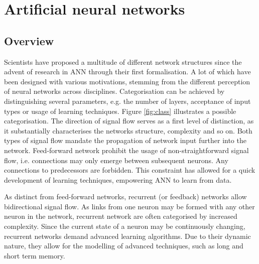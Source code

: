 \documentclass[10pt,a4paper,DIV=11]{scrreprt}
\begin{document}
\chapter{Artificial neural networks}
\label{ch:ann}
\section{Overview}

Scientists have proposed a multitude of different network structures since the advent of research in ANN through their first formalisation. 
A lot of which have been designed with various motivations, stemming from the different perception of neural networks across disciplines.
Categorisation can be achieved by distinguishing several parameters, e.g. the number of layers, acceptance of input types or usage of learning techniques.
Figure \ref{fig:class} illustrates a possible categorisation\cite{NNGER}.
The direction of signal flow serves as a first level of distinction, as it substantially characterises the networks structure, complexity and so on.
Both types of signal flow mandate the propagation of network input further into the network.
Feed-forward network prohibit the usage of non-straightforward signal flow, i.e. connections may only emerge between subsequent neurons.
Any connections to predecessors are forbidden. This constraint has allowed for a quick development of learning techniques, empowering ANN to learn from data. 

As distinct from feed-forward networks, recurrent (or feedback) networks allow bidirectional signal flow. 
As links from one neuron may be formed with any other neuron in the network, recurrent network are often categorised by increased complexity.
Since the current state of a neuron may be continuously changing, recurrent networks demand advanced learning algorithms.
Due to their dynamic nature, they allow for the modelling of advanced techniques, such as long and short term memory.
\end{document}
